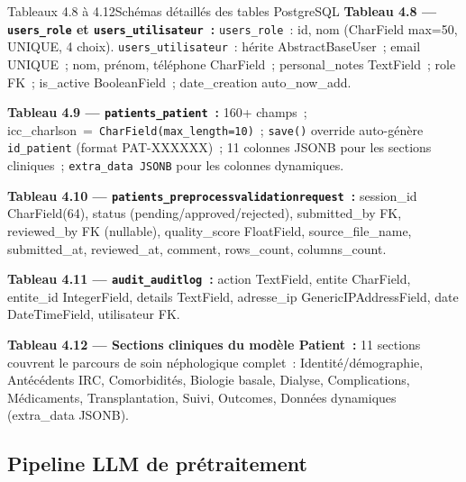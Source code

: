 \documentclass[12pt,a4paper]{article}
\begin{document}
\begin{figbox}{Tableaux 4.8 à 4.12}{Schémas détaillés des tables PostgreSQL}
\textbf{Tableau 4.8 --- \texttt{users\_role} et \texttt{users\_utilisateur}~:}
\texttt{users\_role}~: id, nom (CharField max=50, UNIQUE, 4 choix).
\texttt{users\_utilisateur}~: hérite AbstractBaseUser~; email UNIQUE~; nom, prénom,
téléphone CharField~; personal\_notes TextField~; role FK~; is\_active BooleanField~;
date\_creation auto\_now\_add.

\textbf{Tableau 4.9 --- \texttt{patients\_patient}~:}
160+ champs~; icc\_charlson~=~\texttt{CharField(max\_length=10)}~;
\texttt{save()} override auto-génère \texttt{id\_patient} (format PAT-XXXXXX)~;
11 colonnes JSONB pour les sections cliniques~; \texttt{extra\_data JSONB} pour
les colonnes dynamiques.

\textbf{Tableau 4.10 --- \texttt{patients\_preprocessvalidationrequest}~:}
session\_id CharField(64), status (pending/approved/rejected), submitted\_by FK,
reviewed\_by FK (nullable), quality\_score FloatField, source\_file\_name,
submitted\_at, reviewed\_at, comment, rows\_count, columns\_count.

\textbf{Tableau 4.11 --- \texttt{audit\_auditlog}~:}
action TextField, entite CharField, entite\_id IntegerField, details TextField,
adresse\_ip GenericIPAddressField, date DateTimeField, utilisateur FK.

\textbf{Tableau 4.12 --- Sections cliniques du modèle Patient~:}
11 sections couvrent le parcours de soin néphologique complet~:
Identité/démographie, Antécédents IRC, Comorbidités, Biologie basale,
Dialyse, Complications, Médicaments, Transplantation, Suivi, Outcomes,
Données dynamiques (extra\_data JSONB).
\end{figbox}

\subsection{Pipeline LLM de prétraitement}
\end{document}
